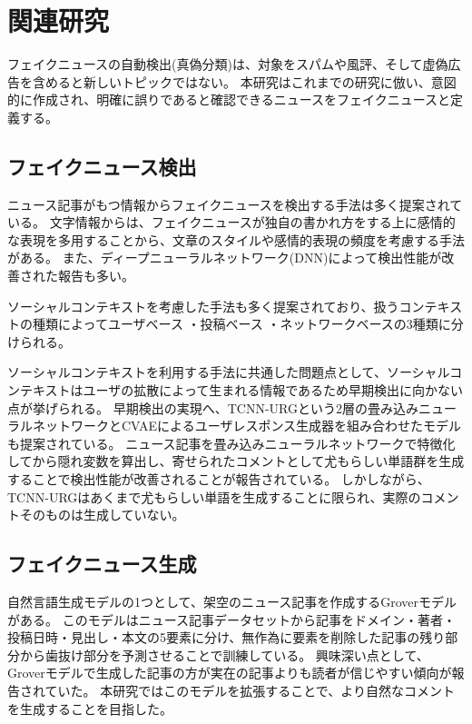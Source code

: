 \section{関連研究}
フェイクニュースの自動検出(真偽分類)は、対象をスパム\cite{shen2017discovering}や風評\cite{7023340}、そして虚偽広告\cite{Huang:2017:DFO:3041021.3054233}を含めると新しいトピックではない。
本研究はこれまでの研究\cite{Shu:2017:FND:3137597.3137600,Ruchansky:2017:CHD:3132847.3132877,Wang:2018:EEA:3219819.3219903}に倣い、意図的に作成され、明確に誤りであると確認できるニュースをフェイクニュースと定義する。

\subsection{フェイクニュース検出}
ニュース記事がもつ情報からフェイクニュースを検出する手法は多く提案されている。
文字情報からは、フェイクニュースが独自の書かれ方をする上に感情的な表現を多用することから、文章のスタイル\cite{DBLP:journals/corr/PotthastKRBS17}や感情的表現の頻度\cite{DBLP:journals/corr/abs-1903-01728}を考慮する手法がある。
また、ディープニューラルネットワーク(DNN)によって検出性能が改善された報告\cite{wang-2017-liar,karimi-tang-2019-learning,karimi-etal-2018-multi}も多い。

ソーシャルコンテキストを考慮した手法も多く提案されており、扱うコンテキストの種類によってユーザベース\cite{Castillo:2011:ICT:1963405.1963500,8397048,DBLP:journals/corr/abs-1904-13355}
・投稿ベース\cite{Yang2019UnsupervisedFN,Tacchini2017SomeLI,Jin:2016:NVE:3016100.3016318}
・ネットワークベース\cite{Wu:2018:TFF:3159652.3159677,DBLP:journals/corr/abs-1902-06673}の3種類に分けられる。

ソーシャルコンテキストを利用する手法に共通した問題点として、ソーシャルコンテキストはユーザの拡散によって生まれる情報であるため早期検出に向かない点が挙げられる。
早期検出の実現へ、TCNN-URGという2層の畳み込みニューラルネットワークとCVAEによるユーザレスポンス生成器を組み合わせたモデルも提案されている\cite{ijcai2018-533}。
ニュース記事を畳み込みニューラルネットワークで特徴化してから隠れ変数を算出し、寄せられたコメントとして尤もらしい単語群を生成することで検出性能が改善されることが報告されている。
しかしながら、TCNN-URGはあくまで尤もらしい単語を生成することに限られ、実際のコメントそのものは生成していない。

\subsection{フェイクニュース生成}
\label{subsec:generate}
自然言語生成モデルの1つとして、架空のニュース記事を作成するGroverモデルがある\cite{NIPS2019_9106}。
このモデルはニュース記事データセットから記事をドメイン・著者・投稿日時・見出し・本文の5要素に分け、無作為に要素を削除した記事の残り部分から歯抜け部分を予測させることで訓練している。
興味深い点として、Groverモデルで生成した記事の方が実在の記事よりも読者が信じやすい傾向が報告されていた。
本研究ではこのモデルを拡張することで、より自然なコメントを生成することを目指した。
